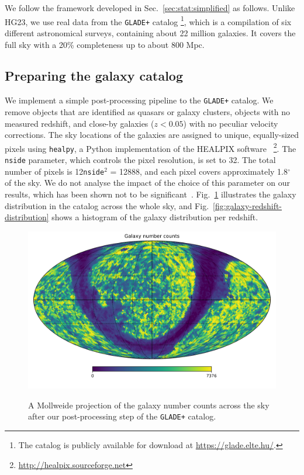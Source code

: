 \documentclass[%
preprint,
nofootinbib,
 amsmath,amssymb,
 aps,
]{revtex4-2}
\begin{document}
We follow the framework developed in Sec.~\ref{sec:stat:simplified} as follows. Unlike HG23, we use
real data from the \texttt{GLADE+} catalog \cite{D_lya_2018,D_lya_2022} \footnote{The catalog is
	publicly available for download at \url{https://glade.elte.hu/}.}, which is a compilation of six
different astronomical surveys, containing about 22 million galaxies. It covers the full sky with a
20\% completeness up to about 800 Mpc.

\subsection{Preparing the galaxy catalog}

We implement a simple post-processing pipeline to the \texttt{GLADE+} catalog. We remove objects
that are identified as quasars or galaxy clusters, objects with no measured redshift, and close-by
galaxies ($z<0.05$) with no peculiar velocity corrections. The sky locations of the galaxies are
assigned to unique, equally-sized pixels using \texttt{healpy}, a Python implementation of the
HEALPIX software~\cite{2005ApJ...622..759G,Zonca2019}
\footnote{\url{http://healpix.sourceforge.net}}. The \texttt{nside} parameter, which controls the
pixel resolution, is set to 32. The total number of pixels is 12\texttt{nside}$^2$ = 12888, and
each pixel covers approximately 1.8$^{\circ}$ of the sky. We do not analyse the impact of the
choice of this parameter on our results, which has been shown not to be
significant~\cite{Gray_2022}. Fig.~\ref{fig:galaxy-map} illustrates the galaxy distribution in the
catalog across the whole sky, and Fig.~\ref{fig:galaxy-redshift-distribution} shows a histogram of
the galaxy distribution per redshift.

\begin{figure}[!ht]
	\caption{A Mollweide projection of the galaxy number counts across the sky after our post-processing step of the \texttt{GLADE+} catalog.}
	\centering
	\includegraphics[width=\textwidth]{../src/figures/galaxy-map.png}
	\label{fig:galaxy-map}
\end{figure}
\end{document}
